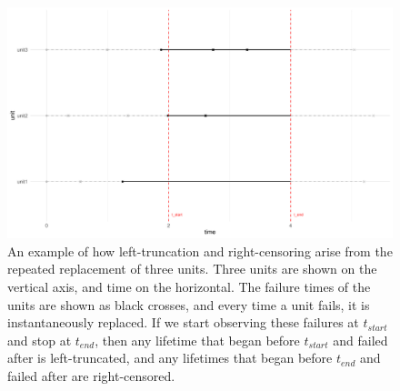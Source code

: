 \begin{figure}[h]
    \centering
    \includegraphics[width=1\textwidth]{./figures/ch-2/left_truncation_w_right_censoring_example.pdf}
    \caption{An example of how left-truncation and right-censoring arise from the repeated replacement of three units. Three units are shown on the vertical axis, and time on the horizontal. The failure times of the units are shown as black crosses, and every time a unit fails, it is instantaneously replaced. If we start observing these failures at $t_{start}$ and stop at $t_{end}$, then any lifetime that began before $t_{start}$ and failed after is left-truncated, and any lifetimes that began before $t_{end}$ and failed after are right-censored.}
    \label{fig:left_trunc_and_right_cens_example}
\end{figure}

